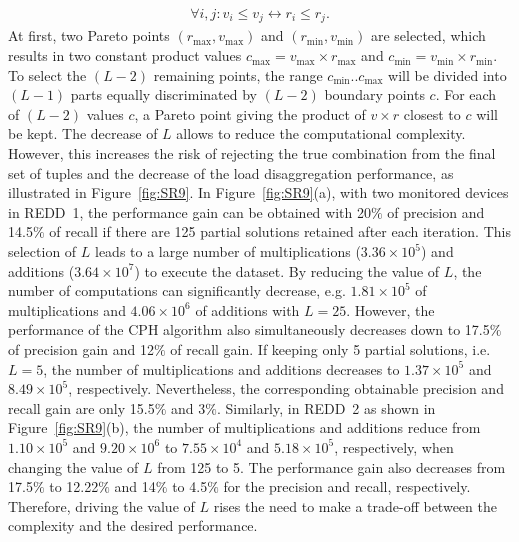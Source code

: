 \begin{eqnarray}
\forall i,j: v_i \leq v_j \leftrightarrow r_i \leq r_j.
\end{eqnarray}
At first, two Pareto points $(r_{\max},v_{\max})$ and $(r_{\min},v_{\min})$ are selected, which results in two constant product values $c_{\max} = v_{\max}\times r_{\max}$ and $c_{\min} = v_{\min}\times r_{\min}$. To select the $(L-2)$ remaining points, the range $c_{\min}..c_{\max}$ will be divided into $(L-1)$ parts equally discriminated by $(L-2)$ boundary points $c$. For each of $(L-2)$ values $c$, a Pareto point giving the product of $v\times r$ closest to $c$ will be kept. 
The decrease of $L$ allows to reduce the computational complexity. However, this increases the risk of rejecting the true combination from the final set of tuples and the decrease of the load disaggregation performance, as illustrated in Figure~\ref{fig:SR9}. 
In Figure~\ref{fig:SR9}(a), with two monitored devices in REDD~1, the performance gain can be obtained with 20$\%$ of precision and 14.5$\%$ of recall if there are 125 partial solutions retained after each iteration. This selection of $L$ leads to a large number of multiplications ($3.36\times 10^5$) and additions ($3.64\times 10^7$) to execute the dataset. By reducing the value of $L$, the number of computations can significantly decrease, e.g. $1.81\times 10^5$ of multiplications and $4.06\times 10^6$ of additions with $L=25$. However, the performance of the CPH algorithm also simultaneously decreases down to 17.5$\%$ of precision gain and 12$\%$ of recall gain. If keeping only 5 partial solutions, i.e. $L=5$, the number of multiplications and additions decreases to $1.37\times 10^5$ and $8.49\times 10^5$, respectively. Nevertheless, the corresponding obtainable precision and recall gain are only 15.5$\%$ and 3$\%$. 
Similarly, in REDD~2 as shown in Figure~\ref{fig:SR9}(b), the number of multiplications and additions reduce from $1.10\times 10^5$ and $9.20\times 10^6$ to $7.55\times 10^4$ and $5.18\times 10^5$, respectively, when changing the value of $L$ from 125 to 5. The performance gain also decreases from 17.5$\%$ to 12.22$\%$ and 14$\%$ to 4.5$\%$ for the precision and recall, respectively.
Therefore, driving the value of $L$ rises the need to make a trade-off between the complexity and the desired performance.
